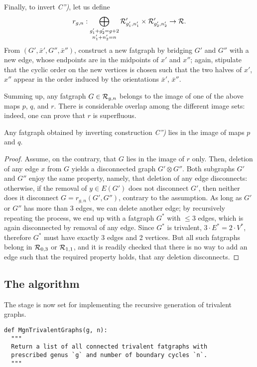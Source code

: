 Finally, to invert {\slshape C'')}, let us define
\begin{equation*}
r_{g,n}: \bigoplus_{\substack{g'_1+g'_2=g+2 \\ n'_1+n'_2=n}} 
\mathcal{R}'_{g'_1, n'_1} \times \mathcal{R}'_{g'_2, n'_2} \to \mathcal{R}.
\end{equation*}
From $(G', \bar{x}', G'',
\bar{x}'')$, construct a new fatgraph by bridging $G'$ and $G''$ with
a new edge, whose endpoints are in the midpoints of $x'$ and $x''$;
again, stipulate that the cyclic order on the new vertices is chosen
such that the two halves of $x'$, $x''$ appear in the order induced by
the orientations $\bar{x}'$, $\bar{x}''$.

Summing up, any fatgraph $G \in \mathcal{R}_{g,n}$ belongs to the image of one
of the above maps $p$, $q$, and $r$. There is considerable
overlap among the different image sets: indeed, one can prove that
$r$ is superfluous.
\begin{lemma}\label{lemma:no-c2}
  Any fatgraph obtained by inverting construction {\slshape C'')} lies in
  the image of maps $p$ and $q$.
\end{lemma}
\begin{proof}
  Assume, on the contrary, that $G$ lies in the image of $r$ only.
  Then, deletion of any edge $x$ from $G$ yields a disconnected graph
  $G' \otimes G''$.  Both subgraphs $G'$ and $G''$ enjoy the same
  property, namely, that deletion of any edge disconnects: otherwise,
  if the removal of $y \in E(G')$ does not disconnect $G'$, then
  neither does it disconnect $G = r_{g,n}(G', G'')$, contrary to the
  assumption. As long as $G'$ or $G''$ has more than 3 edges, we can
  delete another edge; by recursively repeating the process, we end up
  with a fatgraph $G^*$ with $\leq 3$ edges, which is again
  disconnected by removal of any edge.  Since $G^*$ is trivalent, $3
  \cdot E^* = 2 \cdot V^*$, therefore $G^*$ must have exactly 3 edges
  and 2 vertices. But all such fatgraphs belong in $\mathcal{R}_{0,3}$ or
  $\mathcal{R}_{1,1}$, and it is readily checked that there is no way to add an
  edge such that the required property holds, that any deletion
  disconnects.
\end{proof}

\subsection{The  algorithm}
\label{sec:MgnTrivalentGraphs}

The stage is now set for implementing the recursive generation of
trivalent graphs.
\begin{lstlisting}
def MgnTrivalentGraphs(g, n):
  """
  Return a list of all connected trivalent fatgraphs with
  prescribed genus `g` and number of boundary cycles `n`.
  """
\end{lstlisting}

